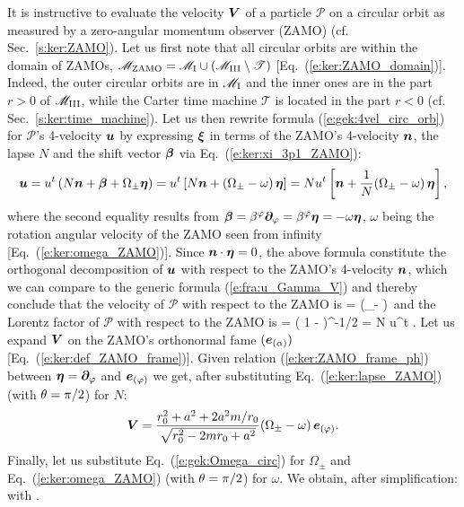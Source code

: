 It is instructive to evaluate the velocity $\bm{V}$ of a particle $\mathscr{P}$
on a circular orbit as measured by a zero-angular momentum observer (ZAMO)
(cf. Sec.~\ref{s:ker:ZAMO}).
Let us first note that all circular orbits are within the domain of ZAMOs,
$\mathscr{M}_{\rm ZAMO} = \mathscr{M}_{\rm I} \cup (\mathscr{M}_{\rm III}\setminus \mathscr{T})$
[Eq.~(\ref{e:ker:ZAMO_domain})]. Indeed, the outer circular orbits are in $\mathscr{M}_{\rm I}$
and the inner ones are in the part $r>0$ of $\mathscr{M}_{\rm III}$, while the
Carter time machine $\mathscr{T}$ is located in the part $r<0$ (cf. Sec.~\ref{s:ker:time_machine}).
Let us then rewrite
formula (\ref{e:gek:4vel_circ_orb}) for $\mathscr{P}$'s 4-velocity $\bm{u}$
by expressing $\bm{\xi}$ in terms of the ZAMO's 4-velocity $\bm{n}$, the lapse $N$
and the shift vector $\bm{\beta}$
via Eq.~(\ref{e:ker:xi_3p1_ZAMO}):
\[
    \bm{u} = u^t\left( N \bm{n} + \bm{\beta} + \Omega_\pm \bm{\eta} \right)
      = u^t \left[ N \bm{n} + (\Omega_\pm - \omega)\, \bm{\eta} \right]
      = N u^t \left[ \bm{n} + \frac{1}{N} (\Omega_\pm - \omega) \, \bm{\eta} \right],
\]
where the second equality results from
$\bm{\beta} = \beta^\varphi \bm{\partial}_\varphi = \beta^\varphi \bm{\eta} = - \omega \bm{\eta}$,
$\omega$ being the rotation angular velocity of the ZAMO seen from
infinity [Eq.~(\ref{e:ker:omega_ZAMO})]. Since $\bm{n}\cdot\bm{\eta} = 0$, the
above formula constitute the orthogonal decomposition of $\bm{u}$ with
respect to the ZAMO's 4-velocity $\bm{n}$, which we can compare to the generic
formula (\ref{e:fra:u_Gamma_V}) and thereby conclude that
the velocity of $\mathscr{P}$ with respect to the ZAMO is
\be
     =  (\Omega_\pm - \omega)\,  \w{\eta}
\ee
and the Lorentz factor of $\mathscr{P}$ with respect to the ZAMO is
\be
    \Gamma = ( 1 - \cdot{})^{-1/2} = N u^t .
\ee
Let us expand $\bm{V}$ on the ZAMO's orthonormal fame $(\bm{e}_{(\alpha)})$
[Eq.~(\ref{e:ker:def_ZAMO_frame})]. Given relation (\ref{e:ker:ZAMO_frame_ph})
between $\bm{\eta} = \bm{\partial}_\varphi$ and $\bm{e}_{(\varphi)}$ we get, after
substituting Eq.~(\ref{e:ker:lapse_ZAMO}) (with $\theta=\pi/2$) for $N$:
\[
  \bm{V} = \frac{r_0^2 + a^2 + 2a^2 m/r_0}{\sqrt{r_0^2 - 2 m r_0 + a^2}}
      (\Omega_\pm - \omega)\, \bm{e}_{(\varphi)} .
\]
Finally, let us substitute Eq.~(\ref{e:gek:Omega_circ}) for $\Omega_\pm$
and Eq.~(\ref{e:ker:omega_ZAMO}) (with $\theta=\pi/2$) for $\omega$. We obtain,
after simplification:
\be \label{e:gek:v_ZAMO_circ_orb}
    \quad \mbox{with} \quad
     .
